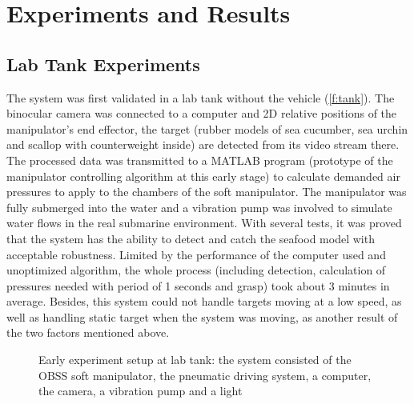 \section{Experiments and Results}

\subsection{Lab Tank Experiments}

The system was first validated in a lab tank without the vehicle
(\autoref{f:tank}). The binocular camera was connected to a computer and 2D
relative positions of the manipulator's end effector, the target (rubber models
of sea cucumber, sea urchin and scallop with counterweight inside) are detected from its
video stream there. The processed data was transmitted to a MATLAB program
(prototype of the manipulator controlling algorithm at this early stage) to
calculate demanded air pressures to apply to the chambers of the soft
manipulator. The manipulator was fully submerged into the water and a vibration
pump was involved to simulate water flows in the real submarine environment.
With several tests, it was proved that the system has the ability to detect and
catch the seafood model with acceptable robustness. Limited by the performance
of the computer used and unoptimized algorithm, the whole process (including
detection, calculation of pressures needed with period of 1 seconds and grasp)
took about 3 minutes in average. Besides, this system could not handle targets
moving at a low speed, as well as handling static target when the system was
moving, as another result of the two factors mentioned above.

\begin{figure}[hb]
    \caption[Early Experiment Setup at Lab Tank]{Early experiment setup at lab
    tank: the system consisted of the \gls{OBSS} soft manipulator, the pneumatic
    driving system, a computer, the  camera, a vibration pump and
    a light}\label{f:tank}
\end{figure}

